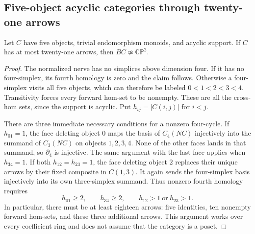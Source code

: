 \subsection{Five-object acyclic categories through twenty-one arrows}

\begin{proposition}\label{C:five-object-acyclic21}
Let $C$ have five objects, trivial endomorphism monoids, and
acyclic support.  If $C$ has at most twenty-one arrows, then
$BC\not\simeq\mathbb {CP}^2$.
\end{proposition}
\begin{proof}
The normalized nerve has no simplices above dimension four.
If it has no four-simplex, its fourth homology is zero and the
claim follows.  Otherwise a four-simplex visits all five objects,
which can therefore be labeled $0<1<2<3<4$.  Transitivity
forces every forward hom-set to be nonempty.  These are all
the cross-hom sets, since the support is acyclic.  Put
$h_{ij}=|C(i,j)|$ for $i<j$.

There are three immediate necessary conditions for a nonzero
four-cycle.  If $h_{01}=1$, the face deleting object $0$ maps
the basis of $C_4(NC)$ injectively into the summand of
$C_3(NC)$ on objects $1,2,3,4$.  None of the other faces
lands in that summand, so $\partial_4$ is injective.  The
same argument with the last face applies when $h_{34}=1$.
If both $h_{12}=h_{23}=1$, the face deleting object $2$
replaces their unique arrows by their fixed composite in
$C(1,3)$.  It again sends the four-simplex basis injectively
into its own three-simplex summand.  Thus nonzero fourth
homology requires
\[
 h_{01}\geq2,\qquad h_{34}\geq2,\qquad
 h_{12}>1\ \text{or}\ h_{23}>1.
\]
In particular, there must be at least eighteen arrows:
five identities, ten nonempty forward hom-sets, and these
three additional arrows.  This argument works over every
coefficient ring and does not assume that the category is
a poset.


\end{proof}
